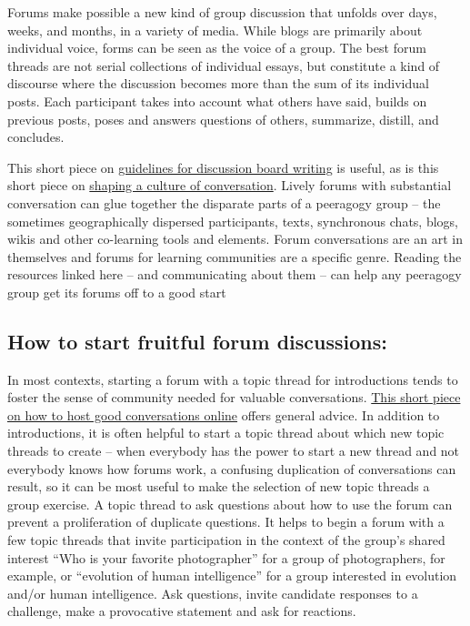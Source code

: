 Forums make possible a new kind of group discussion that unfolds over
days, weeks, and months, in a variety of media. While blogs are
primarily about individual voice, forms can be seen as the voice of a
group. The best forum threads are not serial collections of individual
essays, but constitute a kind of discourse where the discussion becomes
more than the sum of its individual posts. Each participant takes into
account what others have said, builds on previous posts, poses and
answers questions of others, summarize, distill, and concludes.

This short piece on
\href{http://www.lehigh.edu/~indiscus/doc_guidelines.html}{guidelines
for discussion board writing} is useful, as is this short piece on
\href{http://academiccommons.org/commons/essay/shaping-culture-conversation}{shaping
a culture of conversation}. Lively forums with substantial conversation
can glue together the disparate parts of a peeragogy group -- the
sometimes geographically dispersed participants, texts, synchronous
chats, blogs, wikis and other co-learning tools and elements. Forum
conversations are an art in themselves and forums for learning
communities are a specific genre. Reading the resources linked here --
and communicating about them -- can help any peeragogy group get its
forums off to a good start

\hypertarget{how-to-start-fruitful-forum-discussions}{%
\subsection{How to start fruitful forum
discussions:}\label{how-to-start-fruitful-forum-discussions}}

In most contexts, starting a forum with a topic thread for introductions
tends to foster the sense of community needed for valuable
conversations.
\href{http://www.rheingold.com/texts/artonlinehost.html}{This short
piece on how to host good conversations online} offers general advice.
In addition to introductions, it is often helpful to start a topic
thread about which new topic threads to create -- when everybody has the
power to start a new thread and not everybody knows how forums work, a
confusing duplication of conversations can result, so it can be most
useful to make the selection of new topic threads a group exercise. A
topic thread to ask questions about how to use the forum can prevent a
proliferation of duplicate questions. It helps to begin a forum with a
few topic threads that invite participation in the context of the
group's shared interest ``Who is your favorite photographer'' for a
group of photographers, for example, or ``evolution of human
intelligence'' for a group interested in evolution and/or human
intelligence. Ask questions, invite candidate responses to a challenge,
make a provocative statement and ask for reactions.

